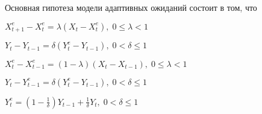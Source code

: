 
\begin{question}
Основная гипотеза модели адаптивных ожиданий состоит в том, что
\begin{answerlist}
  \item \(X_{t+1}^e - X_{t}^e = \lambda (X_{t} - X_{t}^e), \; 0 \leq \lambda < 1\)
  \item \(Y_t - Y_{t-1} = \delta (Y_t^e - Y_{t-1}), \; 0 < \delta \leq 1\)
  \item \(X_t^e - X_{t-1}^e = (1-\lambda) (X_t - X_{t-1}), \; 0 \leq \lambda < 1\)
  \item \(Y_t - Y_{t-1}^e = \delta (Y_t^e - Y_{t-1}), \; 0 < \delta \leq 1\)
  \item \(Y_t^e = \left(1 - \frac{1}{\delta}\right) Y_{t-1} + \frac{1}{\delta} Y_{t}, \; 0 < \delta \leq 1\)
\end{answerlist}
\end{question}


